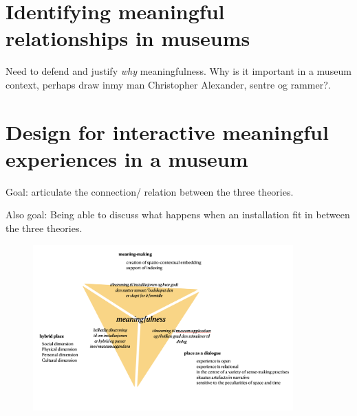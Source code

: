 \section{Identifying meaningful relationships in museums}

Need to defend and justify \emph{why} meaningfulness. Why is it important in a museum context, perhaps draw inmy man Christopher Alexander, sentre og rammer?. 


\section{Design for interactive meaningful experiences in a museum}

Goal: articulate the connection/ relation between the three theories.

Also goal: Being able to discuss what happens when an installation fit in between the three theories.

\begin{figure}[h]
\includegraphics[width=10cm]{pictures/meaningfullness_triangle.png}
\centering 
\end{figure}



